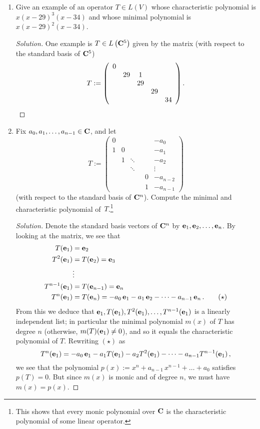 \documentclass[11pt]{amsart}
\begin{document}
\begin{enumerate}[(1)]

\vspace{12pt}

\item Give an example of an operator $T \in L(V)$ whose characteristic polynomial is $x (x-29)^3 (x-34)$ and whose minimal polynomial is $x (x-29)^2 (x-34)$.

\begin{proof}[Solution]
One example is $T \in L \left( \mathbf{C}^5 \right)$ given by the matrix (with respect to the standard basis of $\mathbf{C}^5$)
\[
  T := \left( \begin{array}{cccccccccc}
    0 & \\
      & 29 &  1 & \\
      &    & 29 & \\
      &    &    & 29 & \\
      &    &    &    & 34
  \end{array} \right) . \qedhere
\]
\end{proof}

\item Fix $a_0, a_1, \dots, a_{ n-1 } \in \mathbf{C}$, and let
\[
  T := \left( \begin{array}{ccccc}
    0 &   &        &   & -a_0 \\
    1 & 0 &        &   & -a_1 \\
      & 1 & \ddots &   & -a_2 \\
      &   & \ddots &   & \vdots \\
      &   &        & \ \ \ 0 & -a_{ n-2 } \\
      &   &        & \ \ \ 1 & -a_{ n-1 } 
  \end{array} \right)
\]
(with respect to the standard basis of $\mathbf{C}^n$).
Compute the minimal and characteristic polynomial of~$T$.\footnote{This shows that every monic polynomial over $\mathbf{C}$ is the characteristic polynomial of some linear operator.}

\begin{proof}[Solution]
Denote the standard basis vectors of $\mathbf{C}^n$ by $\mathbf e_1, \mathbf e_2, \dots, \mathbf e_n$.
By looking at the matrix, we see that
\begin{align*}
  T(\mathbf e_1) &= \mathbf e_2 \\
  T^2(\mathbf e_1) &= T(\mathbf e_2) = \mathbf e_3 \\
  &\vdots \\
  T^{ n-1 } (\mathbf e_1) &= T(\mathbf e_{ n-1 }) = \mathbf e_n \\
  T^n (\mathbf e_1) &= T(\mathbf e_n) = -a_0 \, \mathbf e_1 - a_1 \, \mathbf e_2 - \dots - a_{ n-1 } \, \mathbf e_n \, . \qquad (\star)
\end{align*}
From this we deduce that $\mathbf e_1, T(\mathbf e_1), T^2(\mathbf e_1), \dots, T^{n-1}(\mathbf e_1)$ is a linearly independent list; in particular the minimal polynomial $m(x)$ of $T$ has degree $n$ (otherwise, $m(T) (\mathbf e_1) \ne 0$), and so it equals the characteristic polynomial of $T$.
Rewriting $(\star)$ as
\[
  T^n (\mathbf e_1) = -a_0 \, \mathbf e_1 - a_1 T(\mathbf e_1) - a_2 T^2(\mathbf e_1) - \dots - a_{ n-1 } T^{n-1}(\mathbf e_1) \, ,
\]
we see that the polynomial $p(x) := x^n + a_{ n-1 } \, x^{ n-1 } + \dots + a_0$ satisfies $p(T) = 0$.
But since $m(x)$ is monic and of degree $n$, we must have $m(x) = p(x)$.
\end{proof}


\end{enumerate}
\end{document}
